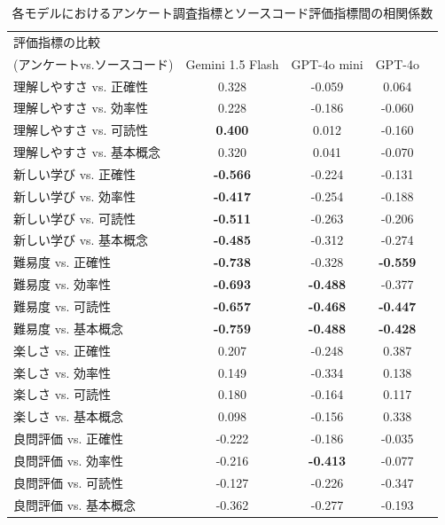 \documentclass[11pt]{jreport}
\begin{document}
\begin{table}[t]
  \centering
  \caption{各モデルにおけるアンケート調査指標とソースコード評価指標間の相関係数}
  \label{tab:correlation_results_all_detailed}
  \begin{threeparttable}
    \begin{tabular}{lcccc}
      \hline
      評価指標の比較\\(アンケートvs.ソースコード) & Gemini 1.5 Flash & GPT-4o mini & GPT-4o\\
      \hline
    理解しやすさ vs. 正確性 & 0.328 & -0.059 & 0.064 \\
    理解しやすさ vs. 効率性 & 0.228 & -0.186 & -0.060 \\
    理解しやすさ vs. 可読性 & \textbf{0.400} & 0.012 & -0.160 \\
    理解しやすさ vs. 基本概念 & 0.320 & 0.041 & -0.070 \\
    \hline
    新しい学び vs. 正確性 & \textbf{-0.566} & -0.224 & -0.131 \\
    新しい学び vs. 効率性 & \textbf{-0.417} & -0.254 & -0.188 \\
    新しい学び vs. 可読性 & \textbf{-0.511} & -0.263 & -0.206 \\
    新しい学び vs. 基本概念 & \textbf{-0.485} & -0.312 & -0.274 \\
    \hline
    難易度 vs. 正確性 & \textbf{-0.738} & -0.328 & \textbf{-0.559} \\
    難易度 vs. 効率性 & \textbf{-0.693} & \textbf{-0.488} & -0.377 \\
    難易度 vs. 可読性 & \textbf{-0.657} & \textbf{-0.468} & \textbf{-0.447} \\
    難易度 vs. 基本概念 & \textbf{-0.759} & \textbf{-0.488} & \textbf{-0.428} \\
    \hline 
    楽しさ vs. 正確性 & 0.207 & -0.248 & 0.387 \\
    楽しさ vs. 効率性 & 0.149 & -0.334 & 0.138 \\
    楽しさ vs. 可読性 & 0.180 & -0.164 & 0.117 \\
    楽しさ vs. 基本概念 & 0.098 & -0.156 & 0.338\\
    \hline
    良問評価 vs. 正確性 & -0.222 & -0.186 & -0.035 \\
    良問評価 vs. 効率性 & -0.216 & \textbf{-0.413} & -0.077 \\
    良問評価 vs. 可読性 & -0.127 & -0.226 & -0.347 \\
    良問評価 vs. 基本概念 & -0.362 & -0.277 & -0.193 \\

\end{tabular}
\end{threeparttable}
\end{table}
\end{document}
